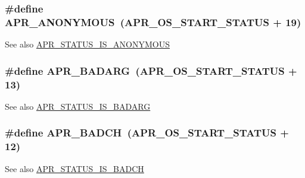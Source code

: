 \subsubsection[{\texorpdfstring{A\+P\+R\+\_\+\+A\+N\+O\+N\+Y\+M\+O\+US}{APR_ANONYMOUS}}]{\setlength{\rightskip}{0pt plus 5cm}\#define A\+P\+R\+\_\+\+A\+N\+O\+N\+Y\+M\+O\+US~({\bf A\+P\+R\+\_\+\+O\+S\+\_\+\+S\+T\+A\+R\+T\+\_\+\+S\+T\+A\+T\+US} + 19)}\hypertarget{group__APR__Error_ga738a229b0c27bd96ae0173fecab251b7}{}\label{group__APR__Error_ga738a229b0c27bd96ae0173fecab251b7}
\begin{DoxySeeAlso}{See also}
\hyperlink{group__APR__STATUS__IS_gabf2969f69ac131cb06178c0809abf943}{A\+P\+R\+\_\+\+S\+T\+A\+T\+U\+S\+\_\+\+I\+S\+\_\+\+A\+N\+O\+N\+Y\+M\+O\+US} 
\end{DoxySeeAlso}
\subsubsection[{\texorpdfstring{A\+P\+R\+\_\+\+B\+A\+D\+A\+RG}{APR_BADARG}}]{\setlength{\rightskip}{0pt plus 5cm}\#define A\+P\+R\+\_\+\+B\+A\+D\+A\+RG~({\bf A\+P\+R\+\_\+\+O\+S\+\_\+\+S\+T\+A\+R\+T\+\_\+\+S\+T\+A\+T\+US} + 13)}\hypertarget{group__APR__Error_ga771bf48ab38d93355be8530f6efe4ae9}{}\label{group__APR__Error_ga771bf48ab38d93355be8530f6efe4ae9}
\begin{DoxySeeAlso}{See also}
\hyperlink{group__APR__STATUS__IS_ga88b31c127ad48d12353d175926913cb3}{A\+P\+R\+\_\+\+S\+T\+A\+T\+U\+S\+\_\+\+I\+S\+\_\+\+B\+A\+D\+A\+RG} 
\end{DoxySeeAlso}
\subsubsection[{\texorpdfstring{A\+P\+R\+\_\+\+B\+A\+D\+CH}{APR_BADCH}}]{\setlength{\rightskip}{0pt plus 5cm}\#define A\+P\+R\+\_\+\+B\+A\+D\+CH~({\bf A\+P\+R\+\_\+\+O\+S\+\_\+\+S\+T\+A\+R\+T\+\_\+\+S\+T\+A\+T\+US} + 12)}\hypertarget{group__APR__Error_ga6f3ca71069880d9fe5678687a257d616}{}\label{group__APR__Error_ga6f3ca71069880d9fe5678687a257d616}
\begin{DoxySeeAlso}{See also}
\hyperlink{group__APR__STATUS__IS_ga20308232897ebff445dc10d0b69a0be2}{A\+P\+R\+\_\+\+S\+T\+A\+T\+U\+S\+\_\+\+I\+S\+\_\+\+B\+A\+D\+CH} 
\end{DoxySeeAlso}
